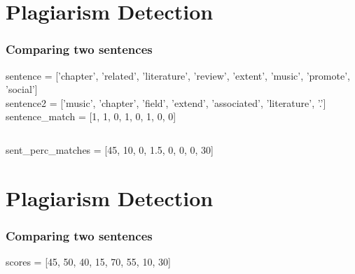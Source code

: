 \documentclass[t]{beamer}
\begin{document}
\section{Plagiarism Detection}
\begin{frame}
	\frametitle{Comparing two sentences}
	
	sentence = ['chapter', 'related', 'literature', 'review', 'extent', 'music', 'promote', 'social']\\
	sentence2 = ['music', 'chapter', 'field', 'extend', 'associated', 'literature', '.']\\
	
	
	sentence\_match = [1, 1, 0, 1, 0, 1, 0, 0]
	
	\inputminted[firstline=127, 
	lastline=131, 
	frame=lines,
	fontsize=\footnotesize
	]{python}{../pumas/docxToText.py}
	
	sent\_perc\_matches = [45, 10, 0, 1.5, 0, 0, 0, 30]	
	
\end{frame}



\section{Plagiarism Detection}
\begin{frame}
	\frametitle{Comparing two sentences}
	
	scores = [45, 50, 40, 15, 70, 55, 10, 30]
	
	\inputminted[firstline=145, 
	lastline=151, 
	frame=lines,
	fontsize=\footnotesize
	]{python}{../pumas/docxToText.py}	
	
\end{frame}
\end{document}
